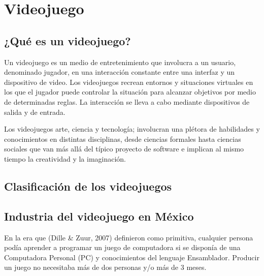 \section{Videojuego}
			\subsection{¿Qué es un videojuego?}
			Un videojuego es un medio de entretenimiento
			que involucra a un usuario, denominado jugador, en
			una interacción constante entre una interfaz y un
			dispositivo de video. Los videojuegos recrean
			entornos y situaciones virtuales en los que el jugador
			puede controlar la situación para
			alcanzar objetivos por medio de determinadas reglas.
			La interacción se lleva a cabo mediante
			dispositivos de salida y de entrada.
		
			Los videojuegos arte, ciencia y tecnología;
			involucran una plétora de habilidades y
			conocimientos en distintas disciplinas, desde ciencias
			formales hasta ciencias sociales que van más allá del
			típico proyecto de software e implican al mismo
			tiempo la creatividad y la imaginación.
			
			\subsection{Clasificación de los videojuegos}
			\subsection{Industria del videojuego en México}
			En la era que (Dille \& Zuur, 2007) definieron
			como primitiva, cualquier persona podía aprender a
			programar un juego de computadora si se disponía de
			una Computadora Personal (PC) y conocimientos del
			lenguaje Ensamblador. Producir un juego no
			necesitaba más de dos personas y/o más de 3 meses.	
		
